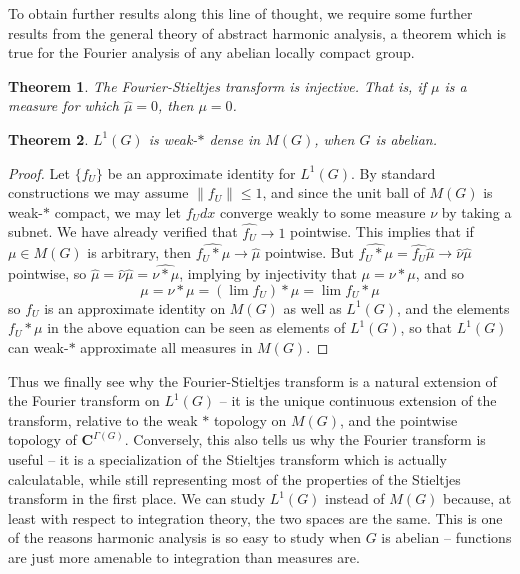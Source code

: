 \documentclass{article}
\theoremstyle{plain}
\newtheorem{theorem}{Theorem}
\theoremstyle{definition}
\begin{document}
To obtain further results along this line of thought, we require some further results from the general theory of abstract harmonic analysis, a theorem which is true for the Fourier analysis of any abelian locally compact group.

\begin{theorem}
    The Fourier-Stieltjes transform is injective. That is, if $\mu$ is a measure for which $\widehat{\mu} = 0$, then $\mu = 0$.
\end{theorem}

\begin{theorem}
    $L^1(G)$ is weak-$*$ dense in $M(G)$, when $G$ is abelian.
\end{theorem}
\begin{proof}
    Let $\{ f_U \}$ be an approximate identity for $L^1(G)$. By standard constructions we may assume $\| f_U \| \leq 1$, and since the unit ball of $M(G)$ is weak-$*$ compact, we may let $f_U dx$ converge weakly to some measure $\nu$ by taking a subnet. We have already verified that $\widehat{f_U} \to 1$ pointwise. This implies that if $\mu \in M(G)$ is arbitrary, then $\widehat{f_U * \mu} \to \widehat{\mu}$ pointwise. But $\widehat{f_U * \mu} = \widehat{f_U} \widehat{\mu} \to \widehat{\nu} \widehat{\mu}$ pointwise, so $\widehat{\mu} = \widehat{\nu} \widehat{\mu} = \widehat{\nu * \mu}$, implying by injectivity that $\mu = \nu * \mu$, and so
    \[ \mu = \nu * \mu = \left( \lim f_U \right) * \mu = \lim f_U * \mu \]
    so $f_U$ is an approximate identity on $M(G)$ as well as $L^1(G)$, and the elements $f_U * \mu$ in the above equation can be seen as elements of $L^1(G)$, so that $L^1(G)$ can weak-$*$ approximate all measures in $M(G)$.
\end{proof}

Thus we finally see why the Fourier-Stieltjes transform is a natural extension of the Fourier transform on $L^1(G)$ -- it is the unique continuous extension of the transform, relative to the weak $*$ topology on $M(G)$, and the pointwise topology of $\mathbf{C}^{\Gamma(G)}$. Conversely, this also tells us why the Fourier transform is useful -- it is a specialization of the Stieltjes transform which is actually calculatable, while still representing most of the properties of the Stieltjes transform in the first place. We can study $L^1(G)$ instead of $M(G)$ because, at least with respect to integration theory, the two spaces are the same. This is one of the reasons harmonic analysis is so easy to study when $G$ is abelian -- functions are just more amenable to integration than measures are.
\end{document}
